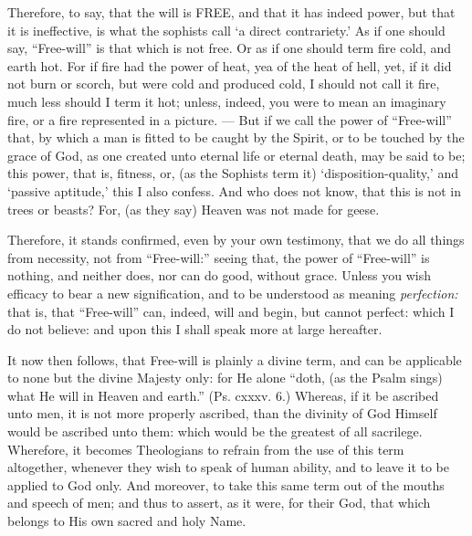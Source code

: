 Therefore, to say, that the will is \textsc{FREE}, and that it has indeed power, but that it is ineffective, is what the sophists call ‘a direct contrariety.’ As if one should say, “Free-will” is that which is not free. Or as if one should term fire cold, and earth hot. For if fire had the power of heat, yea of the heat of hell, yet, if it did not burn or scorch, but were cold and produced cold, I should not call it fire, much less should I term it hot; unless, indeed, you were to mean an imaginary fire, or a fire represented in a picture. — But if we call the power of “Free-will” that, by which a man is fitted to be caught by the Spirit, or to be touched by the grace of God, as one created unto eternal life or eternal death, may be said to be; this power, that is, fitness, or, (as the Sophists term it) ‘disposition-quality,’ and ‘passive aptitude,’ this I also confess. And who does not know, that this is not in trees or beasts? For, (as they say) Heaven was not made for geese.

Therefore, it stands confirmed, even by your own testimony, that we do all things from necessity, not from “Free-will:” seeing that, the power of “Free-will” is nothing, and neither does, nor can do good, without grace. Unless you wish efficacy to bear a new signification, and to be understood as meaning \emph{perfection: }that is, that “Free-will” can, indeed, will and begin, but cannot perfect: which I do not believe: and upon this I shall speak more at large hereafter.

It now then follows, that Free-will is plainly a divine term, and can be applicable to none but the divine Majesty only: for He alone “doth, (as the Psalm sings) what He will in Heaven and earth.” (Ps. cxxxv. 6.) Whereas, if it be ascribed unto men, it is not more properly ascribed, than the divinity of God Himself would be ascribed unto them: which would be the greatest of all sacrilege. Wherefore, it becomes Theologians to refrain from the use of this term altogether, whenever they wish to speak of human ability, and to leave it to be applied to God only. And moreover, to take this same term out of the mouths and speech of men; and thus to assert, as it were, for their God, that which belongs to His own sacred and holy Name.


